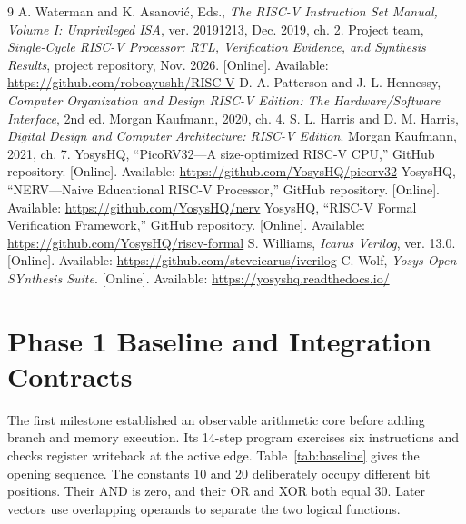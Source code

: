 \documentclass[conference,letterpaper]{IEEEtran}
\begin{document}
\begin{thebibliography}{9}
 A. Waterman and K. Asanovi\'c, Eds., \emph{The RISC-V Instruction Set Manual, Volume I: Unprivileged ISA}, ver. 20191213, Dec. 2019, ch. 2.
 Project team, \emph{Single-Cycle RISC-V Processor: RTL, Verification Evidence, and Synthesis Results}, project repository, Nov. 2026. [Online]. Available: \url{https://github.com/roboayushh/RISC-V}
 D. A. Patterson and J. L. Hennessy, \emph{Computer Organization and Design RISC-V Edition: The Hardware/Software Interface}, 2nd ed. Morgan Kaufmann, 2020, ch. 4.
 S. L. Harris and D. M. Harris, \emph{Digital Design and Computer Architecture: RISC-V Edition}. Morgan Kaufmann, 2021, ch. 7.
 YosysHQ, ``PicoRV32---A size-optimized RISC-V CPU,'' GitHub repository. [Online]. Available: \url{https://github.com/YosysHQ/picorv32}
 YosysHQ, ``NERV---Naive Educational RISC-V Processor,'' GitHub repository. [Online]. Available: \url{https://github.com/YosysHQ/nerv}
 YosysHQ, ``RISC-V Formal Verification Framework,'' GitHub repository. [Online]. Available: \url{https://github.com/YosysHQ/riscv-formal}
 S. Williams, \emph{Icarus Verilog}, ver. 13.0. [Online]. Available: \url{https://github.com/steveicarus/iverilog}
 C. Wolf, \emph{Yosys Open SYnthesis Suite}. [Online]. Available: \url{https://yosyshq.readthedocs.io/}
\end{thebibliography}
\clearpage\onecolumn
\appendices
\section{Phase 1 Baseline and Integration Contracts}
\label{app:baseline}
The first milestone established an observable arithmetic core before adding branch and memory execution. Its 14-step program exercises six instructions and checks register writeback at the active edge. Table~\ref{tab:baseline} gives the opening sequence. The constants 10 and 20 deliberately occupy different bit positions. Their AND is zero, and their OR and XOR both equal 30. Later vectors use overlapping operands to separate the two logical functions.
\end{document}
